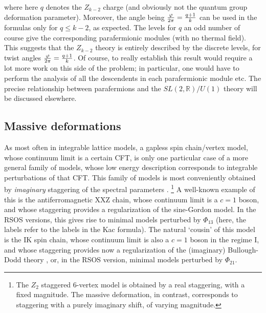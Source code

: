 \documentclass[11pt]{article}
\begin{document}
%
where here $q$ denotes the $Z_{k-2}$ charge (and obviously not the quantum group deformation parameter).
Moreover, the angle being ${\varphi\over2\pi}={q+1\over k}$ can be used in the formulas only for  $q\leq k-2$, as expected. The levels for $q$ an odd number of course give the corresponding parafermionic modules (with no thermal field). This suggests that the $Z_{k-2}$ theory is entirely described by the discrete levels, for twist angles ${\varphi\over2\pi}={q+1\over k}$. Of course, to really establish this result would require a lot more work on this side of the problem; in particular, one would have to perform the analysis of all the descendents in each parafermionic module etc. The precise relationship between parafermions and the $SL(2,\mathbb{R})/U(1)$ theory will be discussed elsewhere.

\subsection{Massive deformations}

As most often in  integrable lattice models, a gapless spin chain/vertex model, whose continuum limit is a certain CFT, is only one particular case of a more general family of models, whose low energy description corresponds to integrable perturbations of that CFT. This family of models is most conveniently obtained by {\sl imaginary}  staggering of the spectral parameters \cite{ResSal}.%
\footnote{The $Z_2$ staggered 6-vertex model is obtained by a real staggering, with a fixed magnitude. The massive deformation, in contrast, corresponds to staggering with a purely imaginary shift, of varying magnitude.}
%
A well-known example of this is the antiferromagnetic XXZ chain, whose continuum limit is a $c=1$ boson, and whose staggering provides a regularization of the sine-Gordon model. In the RSOS versions, this gives rise to minimal models perturbed by $\Phi_{13}$ (here, the labels refer to the labels in the Kac formula)\cite{ResSal}. The natural `cousin' of this model is the IK spin chain, whose continuum limit is also a $c=1$ boson in the regime I, and whose staggering provides now a regularization 
of the (imaginary) Bullough-Dodd theory \cite{BullDodd}, or, in the RSOS version, minimal models perturbed by $\Phi_{21}$\cite{Birgit2}. 
\end{document}
